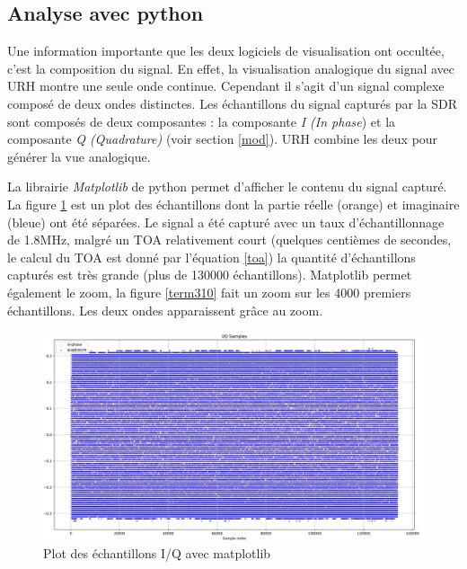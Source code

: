 \subsection{Analyse avec python}

Une information importante que les deux logiciels de visualisation ont occultée, c'est la composition du signal. En effet, la visualisation analogique du signal avec URH montre une seule onde continue. Cependant il s'agit d'un signal complexe composé de deux ondes distinctes. Les échantillons du signal capturés par la SDR sont composés de deux composantes : la composante \textit{I (In phase}) et la composante \textit{Q (Quadrature)} (voir section \ref{mod}). URH combine les deux pour générer la vue analogique.

\vspace{0.1cm}

La librairie \textit{Matplotlib} de python permet d'afficher le contenu du signal capturé. La figure  \ref{term309} est un plot des échantillons dont la partie réelle (orange) et imaginaire (bleue) ont été séparées. Le signal a été capturé avec un taux d'échantil\-lonnage de 1.8MHz, malgré un TOA relativement court (quelques centièmes de secondes, le calcul du TOA est donné par l'équation \ref{toa}) la quantité d'échantillons capturés est très grande (plus de 130000 échantillons). Matplotlib permet également le zoom, la figure \ref{term310} fait un zoom sur les 4000 premiers échantillons. Les deux ondes apparaissent grâce au zoom.

\begin{figure}[h]
\centering

\includegraphics[scale=0.13]{images/iq1.png}
\caption{Plot des échantillons I/Q avec matplotlib}\label{term309}
\end{figure}



